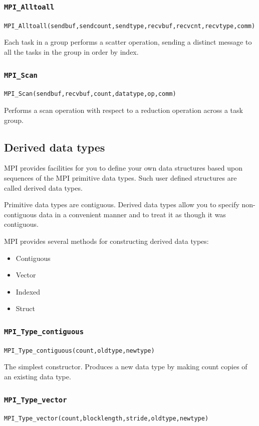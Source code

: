 \subsubsection{\texttt{MPI\_Alltoall}}
\texttt{MPI\_Alltoall(sendbuf,sendcount,sendtype,recvbuf,recvcnt,recvtype,comm)}

Each task in a group performs a scatter operation, sending a distinct message to all the tasks in the group in order by index.  

\subsubsection{\texttt{MPI\_Scan}}
\texttt{MPI\_Scan(sendbuf,recvbuf,count,datatype,op,comm)}

Performs a scan operation with respect to a reduction operation across a task group. 

\subsection{Derived data types} 
MPI provides facilities for you to define your own data structures based upon sequences of the MPI primitive data types. Such user defined structures are called derived data types. 

Primitive data types are contiguous. Derived data types allow you to specify non-contiguous data in a convenient manner and to treat it as though it was contiguous.  

MPI provides several methods for constructing derived data types:  
\begin{itemize}
\item Contiguous  
\item Vector  
\item Indexed  
\item Struct  
\end{itemize}

\subsubsection{\texttt{MPI\_Type\_contiguous}}
\texttt{MPI\_Type\_contiguous(count,oldtype,newtype)  }

The simplest constructor. Produces a new data type by making count copies of an existing data type.  

\subsubsection{\texttt{MPI\_Type\_vector}}
\texttt{MPI\_Type\_vector(count,blocklength,stride,oldtype,newtype) }

